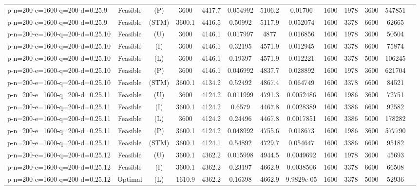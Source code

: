 \documentclass[landscape, a4paper]{article}
\newcommand{\STM}{\ensuremath{\mathrm{STM}}}
\newcommand{\Improved}{\ensuremath{\mathrm{I}}}
\newcommand{\Loose}{\ensuremath{\mathrm{L}}}
\newcommand{\Profit}{\ensuremath{\mathrm{P}}}
\newcommand{\Utility}{\ensuremath{\mathrm{U}}}
\begin{document}
\begin{center}
\begin{tabular}{lcccccccccccc}
p-n=200-e=1600-q=200-d=0.25.9 & Feasible & (\Profit) & 3600 & 4417.7 & 0.054992 & 5106.2 & 0.01706 & 1600 & 1978 & 3600 & 547851 & \\
p-n=200-e=1600-q=200-d=0.25.9 & Feasible & (\STM) & 3600.1 & 4416.5 & 0.50992 & 5117.9 & 0.052074 & 1600 & 3378 & 6600 & 62665 & \\
p-n=200-e=1600-q=200-d=0.25.10 & Feasible & (\Utility) & 3600 & 4146.1 & 0.017997 & 4877 & 0.016856 & 1600 & 1978 & 3600 & 50504 & \\
p-n=200-e=1600-q=200-d=0.25.10 & Feasible & (\Improved) & 3600 & 4146.1 & 0.32195 & 4571.9 & 0.012945 & 1600 & 3378 & 6600 & 75874 & \\
p-n=200-e=1600-q=200-d=0.25.10 & Feasible & (\Loose) & 3600 & 4146.1 & 0.19397 & 4571.9 & 0.012221 & 1600 & 3378 & 5000 & 106245 & \\
p-n=200-e=1600-q=200-d=0.25.10 & Feasible & (\Profit) & 3600 & 4146.1 & 0.046992 & 4837.7 & 0.028892 & 1600 & 1978 & 3600 & 621704 & \\
p-n=200-e=1600-q=200-d=0.25.10 & Feasible & (\STM) & 3600.1 & 4134.2 & 0.52492 & 4867.4 & 0.064749 & 1600 & 3378 & 6600 & 84521 & \\
p-n=200-e=1600-q=200-d=0.25.11 & Feasible & (\Utility) & 3600 & 4124.2 & 0.011999 & 4791.3 & 0.0052486 & 1600 & 1986 & 3600 & 72751 & \\
p-n=200-e=1600-q=200-d=0.25.11 & Feasible & (\Improved) & 3600.1 & 4124.2 & 0.6579 & 4467.8 & 0.0028389 & 1600 & 3386 & 6600 & 92582 & \\
p-n=200-e=1600-q=200-d=0.25.11 & Feasible & (\Loose) & 3600 & 4124.2 & 0.24496 & 4467.8 & 0.0017851 & 1600 & 3386 & 5000 & 178282 & \\
p-n=200-e=1600-q=200-d=0.25.11 & Feasible & (\Profit) & 3600.1 & 4124.2 & 0.048992 & 4755.6 & 0.018673 & 1600 & 1986 & 3600 & 577790 & \\
p-n=200-e=1600-q=200-d=0.25.11 & Feasible & (\STM) & 3600.1 & 4124.1 & 0.54892 & 4729.7 & 0.054647 & 1600 & 3386 & 6600 & 95182 & \\
p-n=200-e=1600-q=200-d=0.25.12 & Feasible & (\Utility) & 3600.1 & 4362.2 & 0.015998 & 4944.5 & 0.0049692 & 1600 & 1978 & 3600 & 45693 & \\
p-n=200-e=1600-q=200-d=0.25.12 & Feasible & (\Improved) & 3600.1 & 4362.2 & 0.23197 & 4662.9 & 0.0038506 & 1600 & 3378 & 6600 & 66508 & \\
p-n=200-e=1600-q=200-d=0.25.12 & Optimal & (\Loose) & 1610.9 & 4362.2 & 0.16398 & 4662.9 & 9.9829e-05 & 1600 & 3378 & 5000 & 52936 & \\

\end{tabular}
\end{center}
\end{document}
